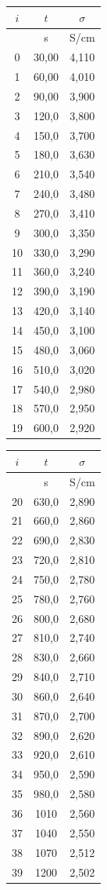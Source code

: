 \documentclass[14pt]{article}
\begin{document}
  \begin{center}
  \begin{tabular}{|c|c|c|}
    \hline
    $i$ & $t$ & $\sigma$\\
    \hline
    & s & S/cm\\
    \hline\hline
    0 & 30,00 & 4,110\\
    1 & 60,00 & 4,010\\
    2 & 90,00 & 3,900\\
    3 & 120,0 & 3,800\\
    4 & 150,0 & 3,700\\
    5 & 180,0 & 3,630\\
    6 & 210,0 & 3,540\\
    7 & 240,0 & 3,480\\
    8 & 270,0 & 3,410\\
    9 & 300,0 & 3,350\\
    10 & 330,0 & 3,290\\
    11 & 360,0 & 3,240\\
    12 & 390,0 & 3,190\\
    13 & 420,0 & 3,140\\
    14 & 450,0 & 3,100\\
    15 & 480,0 & 3,060\\
    16 & 510,0 & 3,020\\
    17 & 540,0 & 2,980\\
    18 & 570,0 & 2,950\\
    19 & 600,0 & 2,920\\
    \hline
  \end{tabular}
  \begin{tabular}{|c|c|c|}
    \hline
    $i$ & $t$ & $\sigma$\\
    \hline
    & s & S/cm\\
    \hline\hline
    20 & 630,0 & 2,890\\
    21 & 660,0 & 2,860\\
    22 & 690,0 & 2,830\\
    23 & 720,0 & 2,810\\
    24 & 750,0 & 2,780\\
    25 & 780,0 & 2,760\\
    26 & 800,0 & 2,680\\
    27 & 810,0 & 2,740\\
    28 & 830,0 & 2,660\\
    29 & 840,0 & 2,710\\
    30 & 860,0 & 2,640\\
    31 & 870,0 & 2,700\\
    32 & 890,0 & 2,620\\
    33 & 920,0 & 2,610\\
    34 & 950,0 & 2,590\\
    35 & 980,0 & 2,580\\
    36 & 1010 & 2,560\\
    37 & 1040 & 2,550\\
    38 & 1070 & 2,512\\
    39 & 1200 & 2,502\\
    \hline
  \end{tabular}
  \end{center}
\end{document}

